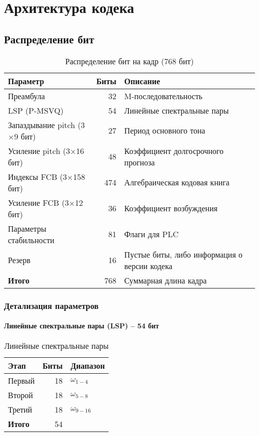 \documentclass{report}
\begin{document}
	\chapter{Архитектура кодека}
	\section{Распределение бит}
	\begin{table}[H]
		\centering
		\caption{Распределение бит на кадр (768 бит)}
		\begin{tabular}{lrl}
			\toprule
			\textbf{Параметр} & \textbf{Биты} & \textbf{Описание} \\
			\midrule
			Преамбула & 32 & M-последовательность \\
			LSP (P-MSVQ) & 54 & Линейные спектральные пары \\
			Запаздывание pitch (3$\times$9 бит) & 27 & Период основного тона \\
			Усиление pitch (3$\times$16 бит) & 48 & Коэффициент долгосрочного прогноза \\
			Индексы FCB (3$\times$158 бит) & 474 & Алгебраическая кодовая книга \\
			Усиление FCB (3$\times$12 бит) & 36 & Коэффициент возбуждения \\
			Параметры стабильности & 81 & Флаги для PLC \\
			Резерв & 16 & Пустые биты, либо информация о версии кодека \\
			\bottomrule
			\textbf{Итого} & 768 & Суммарная длина кадра \\
			\bottomrule
		\end{tabular}
	\end{table}
	
	\subsection{Детализация параметров}
	
	\subsubsection{Линейные спектральные пары (LSP) -- 54 бит}
	
	\begin{table}[H]
		\centering
		\caption{Линейные спектральные пары}
		\begin{tabular}{lrl}
			\toprule
				Этап & Биты & Диапазон \\
			\midrule
				Первый & 18 & $\omega_{1-4}$ \\
				Второй & 18 & $\omega_{5-8}$ \\ 
				Третий & 18 & $\omega_{9-16}$ \\
			\bottomrule
				\textbf{Итого} & 54 & \\
			\bottomrule
		\end{tabular}
	\end{table}
	
\end{document}
